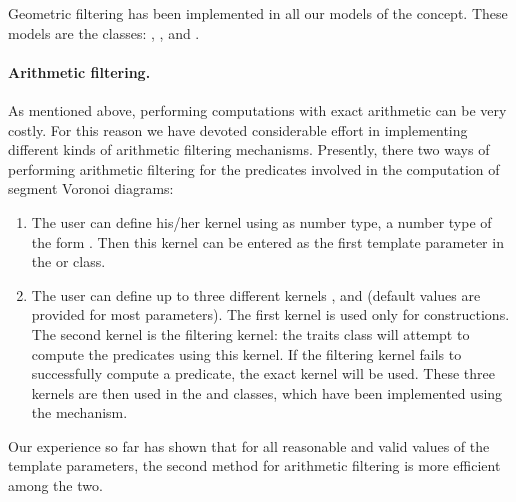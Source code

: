 Geometric filtering has been implemented in all our models of the
 concept. These models are the
classes:
,
,
 and
.



\paragraph{Arithmetic filtering.}
As mentioned above, performing computations with exact arithmetic
can be very costly. For this reason we have devoted considerable
effort in implementing different kinds of arithmetic filtering
mechanisms. Presently, there two ways of performing arithmetic
filtering for the predicates involved in the computation of
segment Voronoi diagrams:
\begin{enumerate}
\item The user can define his/her kernel using as number type, a
  number type of the form . Then this
  kernel can be entered as the first template parameter in the
   or
   class.
\item The user can define up to three different kernels ,
   and  (default values are provided for most
  parameters). The first kernel  is used only for
  constructions. The second kernel  is the filtering kernel:
  the traits class will attempt to compute the predicates using this
  kernel. If the filtering kernel fails to successfully compute a
  predicate, the exact kernel  will be used. These three
  kernels are then used in the 
   and
  classes, which have been implemented using the
   mechanism.
\end{enumerate}
Our experience so far has shown that for all reasonable and valid
values of the template parameters, the second method for arithmetic
filtering is more efficient among the two.

